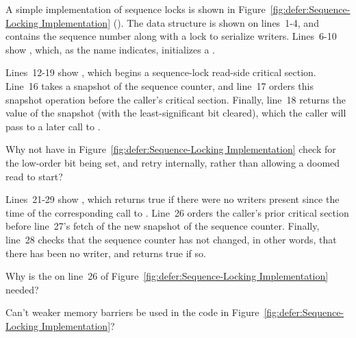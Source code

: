 A simple implementation of sequence locks is shown in
Figure~\ref{fig:defer:Sequence-Locking Implementation}
().
The  data structure is shown on lines~1-4, and contains
the sequence number along with a lock to serialize writers.
Lines~6-10 show , which, as the name indicates,
initializes a .

Lines~12-19 show , which begins a sequence-lock
read-side critical section.
Line~16 takes a snapshot of the sequence counter, and line~17 orders
this snapshot operation before the caller's critical section.
Finally, line~18 returns the value of the snapshot (with the least-significant
bit cleared), which the caller
will pass to a later call to .

\QuickQuiz{}
	Why not have  in
	Figure~\ref{fig:defer:Sequence-Locking Implementation}
	check for the low-order bit being set, and retry
	internally, rather than allowing a doomed read to start?
 \QuickQuizEnd

Lines~21-29 show , which returns true if there
were no writers present since the time of the corresponding
call to .
Line~26 orders the caller's prior critical section before line~27's
fetch of the new snapshot of the sequence counter.
Finally, line~28 checks that the sequence counter has not changed,
in other words, that there has been no writer, and returns true if so.

\QuickQuiz{}
	Why is the  on line~26 of
	Figure~\ref{fig:defer:Sequence-Locking Implementation}
	needed?
 \QuickQuizEnd

\QuickQuiz{}
	Can't weaker memory barriers be used in the code in
	Figure~\ref{fig:defer:Sequence-Locking Implementation}?
 \QuickQuizEnd

